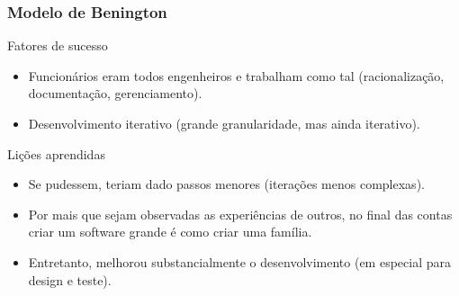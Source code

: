 \begin{frame}[hasnext=false, hasprev=true]
	\frametitle{Modelo de Benington}

	\begin{block:fact}{Fatores de sucesso}
		 \begin{itemize}
				\item Funcionários eram todos engenheiros e trabalham como tal (racionalização,
				documentação, gerenciamento).
				
				\item Desenvolvimento iterativo (grande granularidade, mas ainda iterativo).
		\end{itemize}
	\end{block:fact}
		
	\begin{block:fact}{Lições aprendidas}
		\begin{itemize}
			\item Se pudessem, teriam dado passos menores (iterações menos complexas).
			
			\item Por mais que sejam observadas as experiências de outros, no final das
			contas criar um software grande é como criar uma família.
			
			\item Entretanto, melhorou substancialmente o desenvolvimento
			(em especial para design e teste).
		\end{itemize}
	\end{block:fact}

\end{frame}